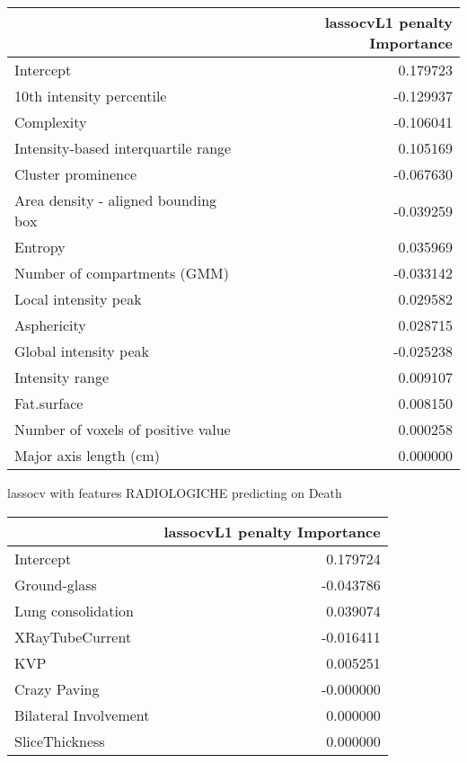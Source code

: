 {\begin{tabular}{lr}
\toprule
{} &  lassocvL1 penalty Importance \\
\midrule
Intercept                           &                      0.179723 \\
10th intensity percentile           &                     -0.129937 \\
Complexity                          &                     -0.106041 \\
Intensity-based interquartile range &                      0.105169 \\
Cluster prominence                  &                     -0.067630 \\
Area density - aligned bounding box &                     -0.039259 \\
Entropy                             &                      0.035969 \\
Number of compartments (GMM)        &                     -0.033142 \\
Local intensity peak                &                      0.029582 \\
Asphericity                         &                      0.028715 \\
Global intensity peak               &                     -0.025238 \\
Intensity range                     &                      0.009107 \\
Fat.surface                         &                      0.008150 \\
Number of voxels of positive value  &                      0.000258 \\
Major axis length (cm)              &                      0.000000 \\
\bottomrule
\end{tabular}

lassocv with features RADIOLOGICHE predicting on Death

\begin{tabular}{lr}
\toprule
{} &  lassocvL1 penalty Importance \\
\midrule
Intercept             &                      0.179724 \\
Ground-glass          &                     -0.043786 \\
Lung consolidation    &                      0.039074 \\
XRayTubeCurrent       &                     -0.016411 \\
KVP                   &                      0.005251 \\
Crazy Paving          &                     -0.000000 \\
Bilateral Involvement &                      0.000000 \\
SliceThickness        &                      0.000000 \\
\bottomrule
\end{tabular}

}
